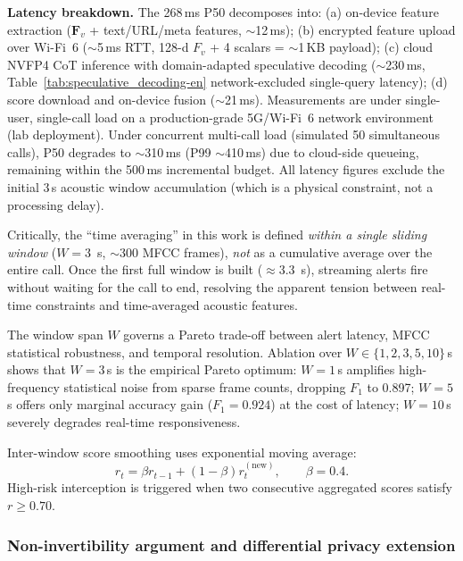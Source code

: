 \documentclass[11pt, a4paper]{article}
\begin{document}
\medskip
\noindent\textbf{Latency breakdown.} The 268\,ms P50 decomposes into: (a) on-device feature extraction ($\bm{F}_v$ + text/URL/meta features, $\sim$12\,ms); (b) encrypted feature upload over Wi-Fi~6 ($\sim$5\,ms RTT, 128-d $F_v$ + 4 scalars = $\sim$1\,KB payload); (c) cloud NVFP4 CoT inference with domain-adapted speculative decoding ($\sim$230\,ms, Table~\ref{tab:speculative_decoding-en} network-excluded single-query latency); (d) score download and on-device fusion ($\sim$21\,ms). Measurements are under single-user, single-call load on a production-grade 5G/Wi-Fi~6 network environment (lab deployment). Under concurrent multi-call load (simulated 50 simultaneous calls), P50 degrades to $\sim$310\,ms (P99 $\sim$410\,ms) due to cloud-side queueing, remaining within the 500\,ms incremental budget. All latency figures exclude the initial 3\,s acoustic window accumulation (which is a physical constraint, not a processing delay).

\medskip
\noindent Critically, the ``time averaging'' in this work is defined \emph{within a single sliding window} ($W=3$~s, $\sim$300 MFCC frames), \emph{not} as a cumulative average over the entire call. Once the first full window is built ($\approx 3.3$~s), streaming alerts fire without waiting for the call to end, resolving the apparent tension between real-time constraints and time-averaged acoustic features.

The window span $W$ governs a Pareto trade-off between alert latency, MFCC statistical robustness, and temporal resolution. Ablation over $W\in\{1,2,3,5,10\}$\,s shows that $W = 3$\,s is the empirical Pareto optimum: $W = 1$\,s amplifies high-frequency statistical noise from sparse frame counts, dropping $F_1$ to 0.897; $W = 5$\,s offers only marginal accuracy gain ($F_1 = 0.924$) at the cost of latency; $W = 10$\,s severely degrades real-time responsiveness.

Inter-window score smoothing uses exponential moving average:
\begin{equation}
r_t = \beta r_{t-1} + (1-\beta)r_t^{(\mathrm{new})}, \qquad \beta = 0.4.
\end{equation}
High-risk interception is triggered when two consecutive aggregated scores satisfy $r\ge 0.70$.

\subsubsection{Non-invertibility argument and differential privacy extension}
\end{document}
